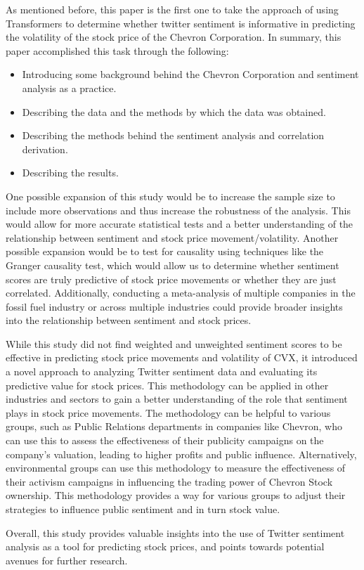 \documentclass[12pt, letterpaper, titlepage]{article}
\newcommand{\jy}[1]{\textcolor{blue}{JY: #1}}
\begin{document}
As mentioned before, this paper is the first one to take the approach of using Transformers to determine whether twitter sentiment is informative in predicting the volatility of the stock price of the Chevron Corporation. In summary, this paper accomplished this task through the following:
\begin{itemize}
    \item Introducing some background behind the Chevron Corporation and sentiment analysis as a practice.
    \item Describing the data and the methods by which the data was obtained.
    \item Describing the methods behind the sentiment analysis and correlation derivation.
    \item Describing the results.
\end{itemize}


One possible expansion of this study would be to increase the sample size to include more observations and thus increase the robustness of the analysis. This would allow for more accurate statistical tests and a better understanding of the relationship between sentiment and stock price movement/volatility. Another possible expansion would be to test for causality using techniques like the Granger causality test, which would allow us to determine whether sentiment scores are truly predictive of stock price movements or whether they are just correlated. Additionally, conducting a meta-analysis of multiple companies in the fossil fuel industry or across multiple industries could provide broader insights into the relationship between sentiment and stock prices. 

While this study did not find weighted and unweighted sentiment scores to be effective in predicting stock price movements and volatility of CVX, it introduced a novel approach to analyzing Twitter sentiment data and evaluating its predictive value for stock prices. This methodology can be applied in other industries and sectors to gain a better understanding of the role that sentiment plays in stock price movements. The methodology can be helpful to various groups, such as Public Relations departments in companies like Chevron, who can use this to assess the effectiveness of their publicity campaigns on the company's valuation, leading to higher profits and public influence. Alternatively, environmental groups can use this methodology to measure the effectiveness of their activism campaigns in influencing the trading power of Chevron Stock ownership. This methodology provides a way for various groups to adjust their strategies to influence public sentiment and in turn stock value.

Overall, this study provides valuable insights into the use of Twitter sentiment analysis as a tool for predicting stock prices, and points towards potential avenues for further research. 




\end{document}
